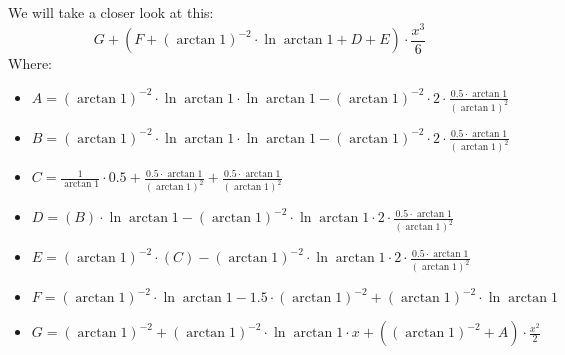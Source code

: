 \documentclass{article}
\begin{document}
We will take a closer look at this:
\begin{equation}
G + \left( F + \left( \arctan 1 \right) ^{-2 } \cdot \ln \arctan 1 + D + E \right) \cdot \frac{x ^{3 } }{6 } 
\end{equation}
Where:
\begin{itemize}
	\item $A = \left( \arctan 1 \right) ^{-2 } \cdot \ln \arctan 1 \cdot \ln \arctan 1 - \left( \arctan 1 \right) ^{-2 } \cdot 2 \cdot \frac{0.5 \cdot \arctan 1 }{\left( \arctan 1 \right) ^{2 } } $
	\item $B = \left( \arctan 1 \right) ^{-2 } \cdot \ln \arctan 1 \cdot \ln \arctan 1 - \left( \arctan 1 \right) ^{-2 } \cdot 2 \cdot \frac{0.5 \cdot \arctan 1 }{\left( \arctan 1 \right) ^{2 } } $
	\item $C = \frac{1 }{\arctan 1 } \cdot 0.5 + \frac{0.5 \cdot \arctan 1 }{\left( \arctan 1 \right) ^{2 } } + \frac{0.5 \cdot \arctan 1 }{\left( \arctan 1 \right) ^{2 } } $
	\item $D = \left( B \right) \cdot \ln \arctan 1 - \left( \arctan 1 \right) ^{-2 } \cdot \ln \arctan 1 \cdot 2 \cdot \frac{0.5 \cdot \arctan 1 }{\left( \arctan 1 \right) ^{2 } } $
	\item $E = \left( \arctan 1 \right) ^{-2 } \cdot \left( C \right) - \left( \arctan 1 \right) ^{-2 } \cdot \ln \arctan 1 \cdot 2 \cdot \frac{0.5 \cdot \arctan 1 }{\left( \arctan 1 \right) ^{2 } } $
	\item $F = \left( \arctan 1 \right) ^{-2 } \cdot \ln \arctan 1 - 1.5 \cdot \left( \arctan 1 \right) ^{-2 } + \left( \arctan 1 \right) ^{-2 } \cdot \ln \arctan 1 $
	\item $G = \left( \arctan 1 \right) ^{-2 } + \left( \arctan 1 \right) ^{-2 } \cdot \ln \arctan 1 \cdot x + \left( \left( \arctan 1 \right) ^{-2 } + A \right) \cdot \frac{x ^{2 } }{2 } $
\end{itemize}
\end{document}
